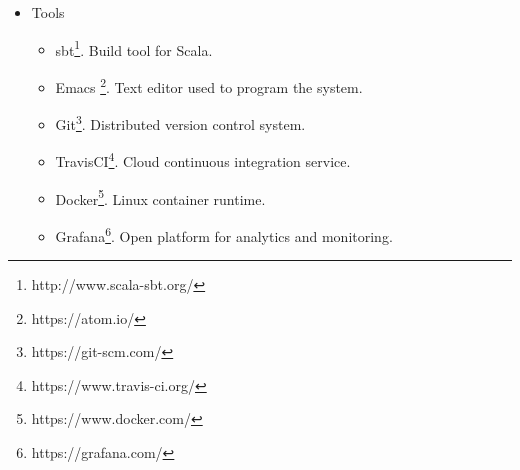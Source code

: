 \begin{itemize}
  \item Tools
    \begin{itemize}
      \item sbt\footnote{http://www.scala-sbt.org/}. Build tool for Scala.
      \item Emacs \footnote{https://atom.io/}. Text editor used to program the system.
      \item Git\footnote{https://git-scm.com/}. Distributed version control system.
      \item TravisCI\footnote{https://www.travis-ci.org/}. Cloud continuous integration service.
      \item Docker\footnote{https://www.docker.com/}. Linux container runtime.
      \item Grafana\footnote{https://grafana.com/}. Open platform for analytics and monitoring.
    \end{itemize}

\end{itemize}


